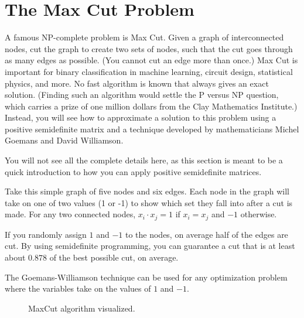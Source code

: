 \section{The Max Cut Problem}
A famous NP-complete problem is Max Cut. Given a graph of interconnected nodes, cut the graph to create two sets of nodes, such that the cut goes through as many edges as possible. (You cannot cut an edge more than once.) Max Cut is important for binary classification in machine learning, circuit design, statistical physics, and more. No fast algorithm is known that always gives an exact solution. (Finding such an algorithm would settle the P versus NP question, which carries a prize of one million dollars from the Clay Mathematics Institute.) Instead, you will see how to approximate a solution to this  problem using a positive semidefinite matrix and a technique developed by mathematicians Michel Goemans and David Williamson. 

You will not see all the complete details here, as this section is meant to be a quick introduction to how you can apply positive semidefinite matrices. 

Take this simple graph of five nodes and six edges. Each node in the graph will take on one of two values (1 or -1) to show which set they fall into after a cut is made. For any two connected nodes, $x_i\cdot x_j = 1$ if $x_i = x_j$ and $-1$ otherwise.

If you randomly assign $1$ and $-1$ to the nodes, on average half of the edges are cut. By using semidefinite programming, you can guarantee a cut that is at least about $0.878$ of the best possible cut, on average. 

The Goemans-Williamson technique can be used for any optimization problem where the variables take on the values of $1$ and $-1$.

\begin{figure}[H]
    \centering
    \caption{MaxCut algorithm visualized.}
    \label{fig:MaxCut}
\end{figure}

